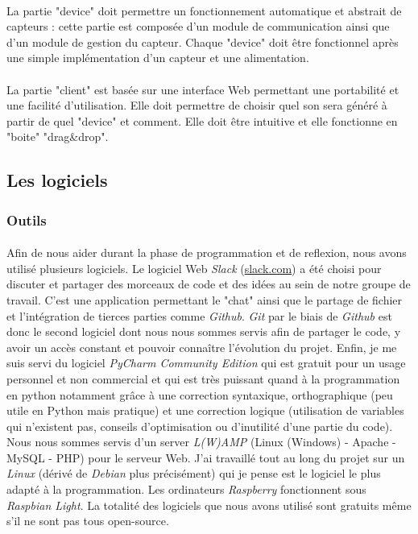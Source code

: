 \documentclass[12pt]{article}
\begin{document}
	\paragraph{}
	La partie "device" doit permettre un fonctionnement automatique et abstrait de capteurs : cette partie est composée d'un module de communication ainsi que d'un module de gestion du capteur. Chaque "device" doit être fonctionnel après une simple implémentation d'un capteur et une alimentation.
	\paragraph{}
	La partie "client" est basée sur une interface Web permettant une portabilité et une facilité d'utilisation. Elle doit permettre de choisir quel son sera généré à partir de quel "device" et comment. Elle doit être intuitive et elle fonctionne en "boite" "drag\&drop".
	\subsection{Les logiciels}
	\subsubsection{Outils}
	\paragraph{}
	Afin de nous aider durant la phase de programmation et de reflexion, nous avons utilisé plusieurs logiciels. Le logiciel Web \textit{Slack} (\url{slack.com}) a été choisi pour discuter et partager des morceaux de code et des idées au sein de notre groupe de travail. C'est une application permettant le "chat" ainsi que le partage de fichier et l'intégration de tierces parties comme \textit{Github}. \textit{Git} par le biais de \textit{Github} est donc le second logiciel dont nous nous sommes servis afin de partager le code, y avoir un accès constant et pouvoir connaître l'évolution du projet. Enfin, je me suis servi du logiciel \textit{PyCharm Community Edition} qui est gratuit pour un usage personnel et non commercial et qui est très puissant quand à la programmation en python notamment grâce à une correction syntaxique, orthographique (peu utile en Python mais pratique) et une correction logique (utilisation de variables qui n'existent pas, conseils d'optimisation ou d'inutilité d'une partie du code). Nous nous sommes servis d'un server \textit{L(W)AMP} (Linux (Windows) - Apache - MySQL - PHP) pour le serveur Web. J'ai travaillé tout au long du projet sur un \textit{Linux} (dérivé de \textit{Debian} plus précisément) qui je pense est le logiciel le plus adapté à la programmation. Les ordinateurs \textit{Raspberry} fonctionnent sous \textit{Raspbian Light}. La totalité des logiciels que nous avons utilisé sont gratuits même s'il ne sont pas tous open-source.
\end{document}
